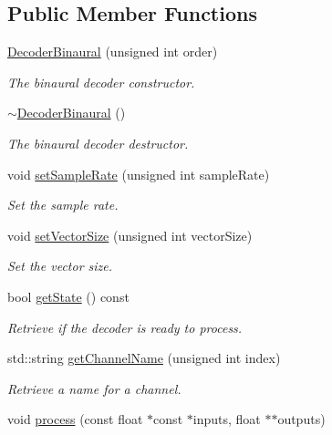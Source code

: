 \subsection*{Public Member Functions}
\begin{DoxyCompactItemize}
\item 
\hyperlink{class_hoa2_d_1_1_decoder_binaural_a614b402069c035eb1bb03d3ec79c4098}{Decoder\-Binaural} (unsigned int order)
\begin{DoxyCompactList}\small\item\em The binaural decoder constructor. \end{DoxyCompactList}\item 
\hyperlink{class_hoa2_d_1_1_decoder_binaural_a3aa8b84a571c2c031dcae2b94b8737e4}{$\sim$\-Decoder\-Binaural} ()
\begin{DoxyCompactList}\small\item\em The binaural decoder destructor. \end{DoxyCompactList}\item 
void \hyperlink{class_hoa2_d_1_1_decoder_binaural_a6a96a705952a4165dd916c74b64b60e4}{set\-Sample\-Rate} (unsigned int sample\-Rate)
\begin{DoxyCompactList}\small\item\em Set the sample rate. \end{DoxyCompactList}\item 
void \hyperlink{class_hoa2_d_1_1_decoder_binaural_a0c5dd214c4d8661439098d8d2031ecb9}{set\-Vector\-Size} (unsigned int vector\-Size)
\begin{DoxyCompactList}\small\item\em Set the vector size. \end{DoxyCompactList}\item 
bool \hyperlink{class_hoa2_d_1_1_decoder_binaural_a8cb958da4f7f5f5888cd894a52f69aa5}{get\-State} () const 
\begin{DoxyCompactList}\small\item\em Retrieve if the decoder is ready to process. \end{DoxyCompactList}\item 
std\-::string \hyperlink{class_hoa2_d_1_1_decoder_binaural_a045e4d443418211eca3074e10719ecd5}{get\-Channel\-Name} (unsigned int index)
\begin{DoxyCompactList}\small\item\em Retrieve a name for a channel. \end{DoxyCompactList}\item 
void \hyperlink{class_hoa2_d_1_1_decoder_binaural_accbfe84ed3e43f1e9ca93e58edb7020f}{process} (const float $\ast$const $\ast$inputs, float $\ast$$\ast$outputs)
$$
\end{DoxyCompactItemize}
